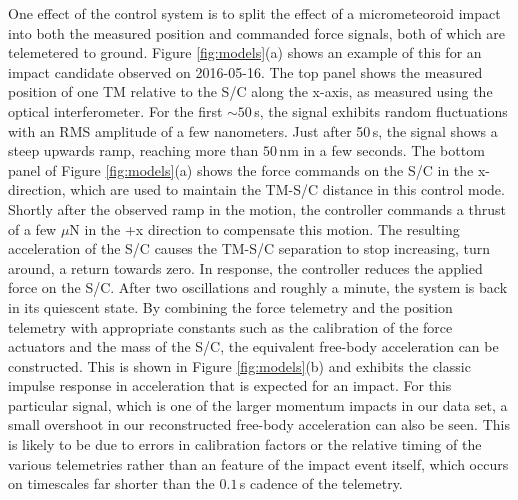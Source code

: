 \documentclass[twocolumn, trackchanges]{aastex61}
\begin{document}
One effect of the control system is to split the effect of a micrometeoroid impact into both the measured position and commanded force signals, both of which are telemetered to ground. Figure \ref{fig:models}(a) shows an example of this for an impact candidate observed on 2016-05-16.  The top panel shows the measured position of one TM relative to the S/C along the x-axis, as measured using the optical interferometer.  For the first $\sim50\,$s, the signal exhibits random fluctuations with an RMS amplitude of a few nanometers. Just after 50$\,$s, the signal shows a steep upwards ramp, reaching more than $50\,$nm in a few seconds.  The bottom panel of Figure \ref{fig:models}(a) shows the force commands on the S/C in the x-direction, which are used to maintain the TM-S/C distance in this control mode. Shortly after the observed ramp in the motion, the controller commands a thrust of a few $\mu$N in the +x direction to compensate this motion.  The resulting acceleration of the S/C causes the TM-S/C separation to stop increasing, turn around, a return towards zero. In response, the controller reduces the applied force on the S/C. After two oscillations and roughly a minute, the system is back in its quiescent state.  By combining the force telemetry and the position telemetry with appropriate constants such as the calibration of the force actuators and the mass of the S/C, the equivalent free-body acceleration can be constructed. This is shown in Figure \ref{fig:models}(b) and exhibits the classic impulse response in acceleration that is expected for an impact. For this particular signal, which is one of the larger momentum impacts in our data set, a small overshoot in our reconstructed free-body acceleration can also be seen. This is likely to be due to errors in calibration factors or the relative timing of the various telemetries rather than an feature of the impact event itself, which occurs on timescales far shorter than the $0.1\,$s cadence of the telemetry. 
\end{document}

